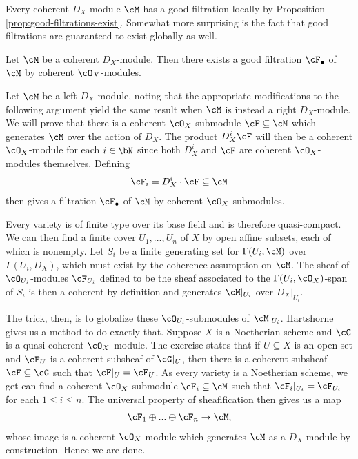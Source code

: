 Every coherent $D_X$-module $\cM$ has a good filtration locally by Proposition \ref{prop:good-filtrations-exist}. Somewhat more surprising is the fact that good filtrations are guaranteed to exist globally as well.
\begin{lem}\label{lem:global-good-filtrations-exist}
	Let $\cM$ be a coherent $D_X$-module. Then there exists a good filtration $\cF_\bullet$ of $\cM$ by coherent $\cO_X$-modules.
\end{lem}
\begin{prf}
	Let $\cM$ be a left $D_X$-module, noting that the appropriate modifications to the following argument yield the same result when $\cM$ is instead a right $D_X$-module. We will prove that there is a coherent $\cO_X$-submodule $\cF \subseteq \cM$ which generates $\cM$ over the action of $D_X$. The product $D^i_X\cF$ will then be a coherent $\cO_X$-module for each $i\in \bN$ since both $D^i_X$ and $\cF$ are coherent $\cO_X$-modules themselves. Defining
	\begin{align*}
		\cF_i = D^i_{X}\cdot \cF \subseteq \cM
	\end{align*}
	then gives a filtration $\cF_\bullet$ of $\cM$ by coherent $\cO_X$-submodules.

	Every variety is of finite type over its base field and is therefore quasi-compact. We can then find a finite cover $U_1,...,U_n$ of $X$ by open affine subsets, each of which is nonempty. Let $S_i$ be a finite generating set for $\Gamma(U_i,\cM)$ over $\Gamma(U_i,D_X)$, which must exist by the coherence assumption on $\cM$. The sheaf of $\cO_{U_i}$-modules $\cF_{U_i}$ defined to be the sheaf associated to the $\Gamma(U_i,\cO_X)$-span of $S_i$ is then a coherent by definition and generates $\cM|_{U_i}$ over $D_X|_{U_i}$.

	The trick, then, is to globalize these $\cO_{U_i}$-submodules of $\cM|_{U_i}$. Hartshorne \cite[Exercise 2.5.15]{hartshorne} gives us a method to do exactly that. Suppose $X$ is a Noetherian scheme and $\cG$ is a quasi-coherent $\cO_X$-module. The exercise states that if $U\subseteq X$ is an open set and $\cF_U$ is a coherent subsheaf of $\cG|_U$, then there is a coherent subsheaf $\cF\subseteq \cG$ such that $\cF|_{U} = \cF_U$. As every variety is a Noetherian scheme, we get can find a coherent $\cO_X$-submodule $\cF_i \subseteq \cM$ such that $\cF_i|_{U_i} = \cF_{U_i}$ for each $1\leq i\leq n$. The universal property of sheafification then gives us a map
	\begin{align*}
		\cF_1\oplus...\oplus\cF_n \to \cM,
	\end{align*}
	whose image is a coherent $\cO_X$-module which generates $\cM$ as a $D_X$-module by construction. Hence we are done.
\end{prf}

